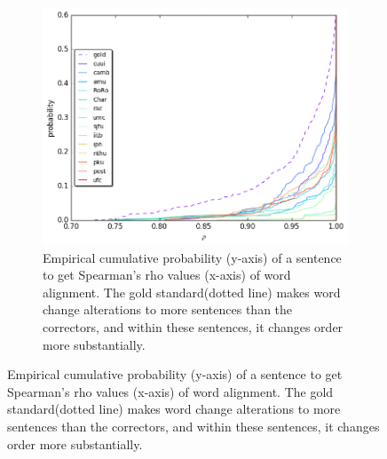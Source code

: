 \documentclass[letterpaper, 11pt]{article}
\newcommand{\com}[1]{}
\begin{document}
{\begin{figure}
  \begin{subfigure}[]{0.4\textwidth}
  	\com{\caption{\label{fig:rho}}}
    \includegraphics[width = \textwidth]{spearman_ecdf}
    \caption{Empirical cumulative probability (y-axis) of a sentence to get Spearman's rho values (x-axis) of word alignment. The gold standard(dotted line) makes word change alterations to more sentences than the correctors, and within these sentences, it changes order more substantially.\label{fig:rho}}
  \end{subfigure}


\end{figure}}
\end{document}
